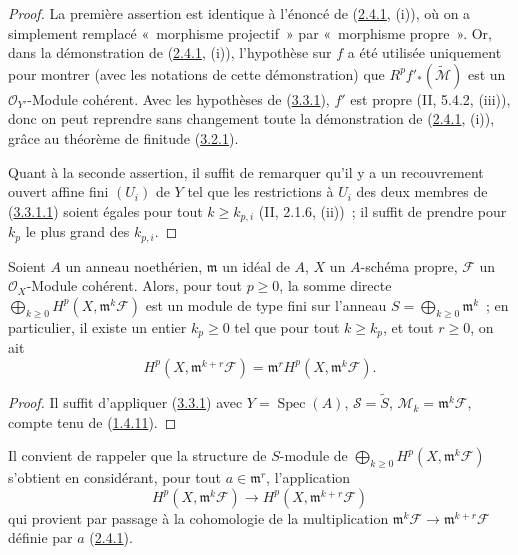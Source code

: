 \begin{proof}
La première assertion est identique à l'énoncé de
(\hyperref[III.2.4.1-fr]{2.4.1}, (i)), où on a simplement remplacé
«~morphisme projectif~» par «~morphisme propre~». Or, dans la démonstration
de (\hyperref[III.2.4.1-fr]{2.4.1}, (i)), l'hypothèse sur $f$ a été utilisée
uniquement pour montrer (avec les notations de cette démonstration) que
$R^pf'_*(\widetilde{\mathcal M})$ est un $\mathcal O_{Y'}$-Module cohérent.
Avec les hypothèses de (\hyperref[III.3.3.1-fr]{3.3.1}), $f'$ est propre
(II, 5.4.2, (iii)), donc on peut reprendre sans changement toute la
démonstration de (\hyperref[III.2.4.1-fr]{2.4.1}, (i)), grâce au théorème de
finitude (\hyperref[III.3.2.1-fr]{3.2.1}).

Quant à la seconde assertion, il suffit de remarquer qu'il y a un
recouvrement ouvert affine fini $(U_i)$ de $Y$ tel que les restrictions à
$U_i$ des deux membres de
(\hyperref[III.3.3.1.1-fr]{3.3.1.1}) soient égales pour tout
$k\geq k_{p,i}$ (II, 2.1.6, (ii))~; il suffit de prendre pour $k_p$ le plus
grand des $k_{p,i}$.
\end{proof}

\begin{corollary}[3.3.2]
\label{III.3.3.2-fr}
Soient $A$ un anneau noethérien, $\mathfrak m$ un idéal de $A$, $X$ un
$A$-schéma propre, $\mathcal F$ un $\mathcal O_X$-Module cohérent. Alors,
pour tout $p\geq0$, la somme directe
$\bigoplus_{k\geq0}H^p(X,\mathfrak m^k\mathcal F)$ est un module de type fini
sur l'anneau $S=\bigoplus_{k\geq0}\mathfrak m^k$~; en particulier, il existe
un entier $k_p\geq0$ tel que pour tout $k\geq k_p$, et tout $r\geq0$, on ait
\[
H^p(X,\mathfrak m^{k+r}\mathcal F)
=\mathfrak m^rH^p(X,\mathfrak m^k\mathcal F).
\tag{3.3.2.1}\label{III.3.3.2.1-fr}
\]
\end{corollary}

\begin{proof}
Il suffit d'appliquer (\hyperref[III.3.3.1-fr]{3.3.1}) avec
$Y=\operatorname{Spec}(A)$, $\mathcal S=\widetilde S$,
$\mathcal M_k=\mathfrak m^k\mathcal F$, compte tenu de
(\hyperref[III.1.4.11-fr]{1.4.11}).
\end{proof}

Il convient de rappeler que la structure de $S$-module de
$\bigoplus_{k\geq0}H^p(X,\mathfrak m^k\mathcal F)$ s'obtient en considérant,
pour tout $a\in\mathfrak m^r$, l'application
\[
H^p(X,\mathfrak m^k\mathcal F)
\longrightarrow H^p(X,\mathfrak m^{k+r}\mathcal F)
\]
qui provient par passage à la cohomologie de la multiplication
$\mathfrak m^k\mathcal F\to\mathfrak m^{k+r}\mathcal F$ définie par $a$
(\hyperref[III.2.4.1-fr]{2.4.1}).

